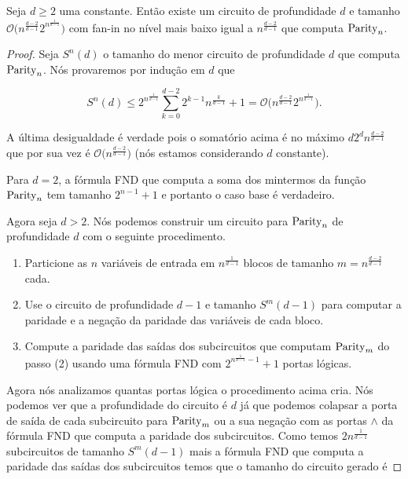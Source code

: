 \begin{teo} \label{parity_upper_bound}

Seja $d \geq 2$ uma constante. Então existe um circuito de profundidade $d$ e tamanho $\mathcal{O} \Big(n^{\frac{d - 2}{d - 1}}2^{n^{\frac{1}{d - 1}}} \Big)$ com fan-in no nível mais baixo igual a $n^{\frac{d - 2}{d - 1}}$ que computa $\text{Parity}_{n}$.

\end{teo}

\begin{proof}

Seja $S^{n}(d)$ o tamanho do menor circuito de profundidade $d$ que computa $\text{Parity}_{n}$. Nós provaremos por indução em $d$ que

\begin{equation*}
    S^{n}(d) \leq 2^{n^{\frac{1}{d - 1}}} \sum_{k = 0}^{d - 2}2^{k - 1}n^{\frac{k}{d - 1}} + 1 = \mathcal{O} \Big(n^{\frac{d - 2}{d - 1}}2^{n^{\frac{1}{d - 1}}} \Big).
\end{equation*}

A última desigualdade é verdade pois o somatório acima é no máximo $d2^{d}n^{\frac{d - 2}{d - 1}}$ que por sua vez é $\mathcal{O} \big( n^{\frac{d - 2}{d - 1}} \big)$ (nós estamos considerando $d$ constante).

Para $d = 2$, a fórmula FND que computa a soma dos mintermos da função $\text{Parity}_{n}$ tem tamanho $2^{n - 1} + 1$ e portanto o caso base é verdadeiro.

Agora seja $d > 2$. Nós podemos construir um circuito para $\text{Parity}_{n}$ de profundidade $d$ com o seguinte procedimento.

\begin{enumerate}

    \item Particione as $n$ variáveis de entrada em $n^{\frac{1}{d - 1}}$ blocos de tamanho $m = n^{\frac{d - 2}{d - 1}}$ cada.
    
    \item Use o circuito de profundidade $d - 1$ e tamanho $S^{m}(d - 1)$ para computar a paridade e a negação da paridade das variáveis de cada bloco.
    
    \item Compute a paridade das saídas dos subcircuitos que computam $\text{Parity}_{m}$ do passo (2) usando uma fórmula FND com $2^{n^{\frac{1}{d - 1}} - 1} + 1$ portas lógicas.

\end{enumerate}

Agora nós analizamos quantas portas lógica o procedimento acima cria. Nós podemos ver que a profundidade do circuito é $d$ já que podemos colapsar a porta de saída de cada subcircuito para $\text{Parity}_{m}$ ou a sua negação com as portas $\land$ da fórmula FND que computa a paridade dos subcircuitos. Como temos $2n^{\frac{1}{d - 1}}$ subcircuitos de tamanho $S^{m}(d - 1)$ mais a fórmula FND que computa a paridade das saídas dos subcircuitos temos que o tamanho do circuito gerado é


\end{proof}
